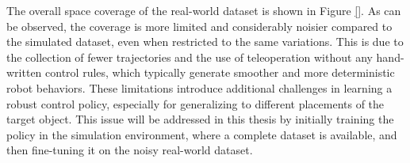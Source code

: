 The overall space coverage of the real-world dataset is shown in Figure \ref{}. As can be observed, the coverage is more limited and considerably noisier compared to the simulated dataset, even when restricted to the same variations. This is due to the collection of fewer trajectories and the use of teleoperation without any hand-written control rules, which typically generate smoother and more deterministic robot behaviors. These limitations introduce additional challenges in learning a robust control policy, especially for generalizing to different placements of the target object. This issue will be addressed in this thesis by initially training the policy in the simulation environment, where a complete dataset is available, and then fine-tuning it on the noisy real-world dataset.
